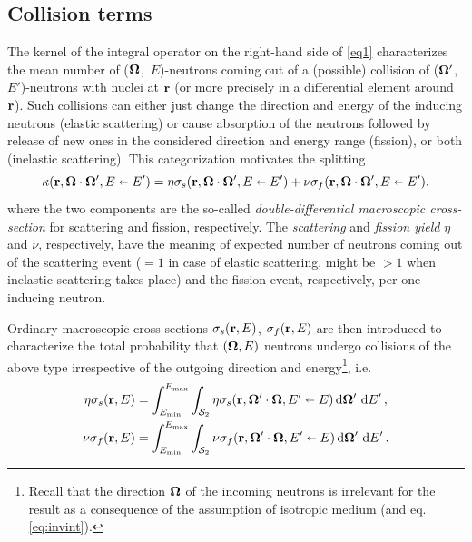 \subsection{Collision terms}
The kernel of the integral operator on the right-hand side of \eqref{eq1} characterizes the mean number of 
($\bomega$,~$E$)-neutrons coming out of a (possible) collision of 
($\bomega'$,~$E'$)-neutrons with nuclei at $\br$ (or more precisely in a
differential element around $\br$). Such collisions can either just change the direction and energy of the
inducing neutrons (elastic scattering) or cause absorption of the neutrons followed by release of
new ones in the considered direction and energy range (fission), or both (inelastic scattering). This categorization
motivates the splitting 
\begin{equation}\label{eq:splitting}
  \kappa(\br,\bomega\cdot\bomega',E\sla E') = \eta\sigma_s(\br,\bomega\cdot\bomega',E\sla E') +
  \nu\sigma_f(\br,\bomega\cdot\bomega',E\sla E').
\end{equation}
where the two components are the so-called \textit{double-differential macroscopic
cross-section} for scattering and fission, respectively. 
The \textit{scattering} and \textit{fission yield} $\eta$ and $\nu$, respectively, have the meaning of expected
number of neutrons coming out of the scattering event ($=1$ in case of elastic scattering, might be $> 1$ when 
inelastic scattering takes place) and the fission event, respectively, per one inducing neutron.%

Ordinary macroscopic cross-sections $\sigma_s(\br,E)$,
$\sigma_f(\br,E)$ are then introduced to characterize the total probability that $(\bomega,E)$ neutrons undergo collisions of the above type irrespective of the outgoing direction and
energy\footnote{Recall that the direction $\bomega$ of the incoming neutrons is irrelevant for the result as a
consequence of the assumption of isotropic medium (and eq. \eqref{eq:invint}).}, i.e.
\begin{equation}\label{eq:ddifxs}
\begin{aligned}
\eta\sigma_s(\br, E) &=
\intE[']{\Emin}{\Emax}{\intA[']{\eta\sigma_s(\br,\bomega'\cdot\bomega, E'\sla E)}},\\
\nu\sigma_f(\br, E) &= \intE[']{\Emin}{\Emax}{\intA[']{\nu\sigma_f(\br,\bomega'\cdot\bomega, 
	E'\sla E)}}.
\end{aligned}
\end{equation}

